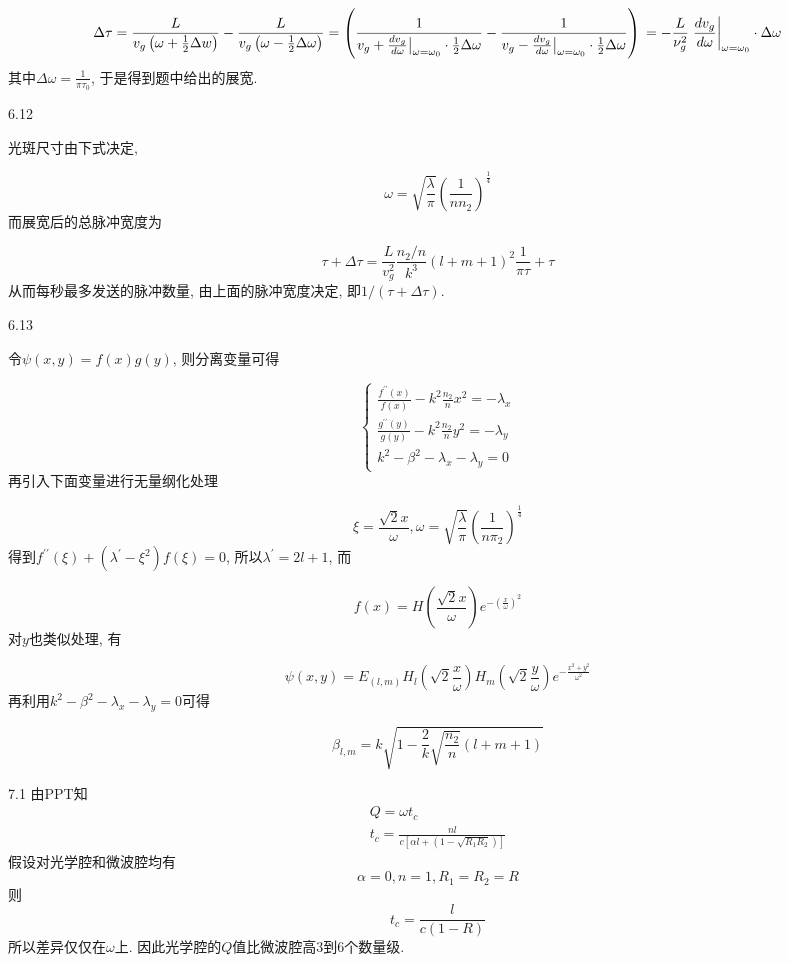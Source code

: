 \[\Delta\tau=\frac{L}{v_{g}\left(\omega+\frac{1}{2} \Delta w\right)}-\frac{L}{v_{g}\left(\omega-\frac{1}{2} \Delta \omega\right)}=\left(\frac{1}{v_g+\frac{d v_{g}}{d \omega} \big| _{\omega=\omega_{0}} \cdot \frac{1}{2} \Delta \omega}-\frac{1}{v_g-\frac{d v_{g}}{d \omega} \big| _{\omega=\omega_{0}} \cdot \frac{1}{2} \Delta \omega}\right)\\=-\frac{L}{\nu_{g}^{2}}\left.\frac{d v_{g}}{d \omega}\right|_{\omega=\omega_{0}} \cdot \Delta \omega \]
其中\(\Delta \omega=\frac{1}{\pi \tau_{0}}\), 于是得到题中给出的展宽.

6.12

光斑尺寸由下式决定,

\[\omega=\sqrt{\frac{\lambda}{\pi}}\left(\frac{1}{n n_{2}}\right)^{\frac{1}{4}} \]
而展宽后的总脉冲宽度为

\[\tau+\Delta \tau=\frac{L}{v_{g}^{2}} \frac{n_{2} / n}{k^{3}}(l+m+1)^{2} \frac{1}{\pi \tau}+\tau \]
从而每秒最多发送的脉冲数量, 由上面的脉冲宽度决定, 即\(1/(\tau+\Delta\tau)\).

6.13

令\(\psi(x, y)=f(x) g(y)\), 则分离变量可得

\[\left\{\begin{array}{l}{\frac{f^{\prime \prime}(x)}{f(x)}-k^{2} \frac{n_{2}}{n} x^{2}=-\lambda_x} \\ {\frac{g^{\prime \prime}(y)}{g(y)}-k^{2} \frac{n_{2}}{n} y^{2}=-\lambda_{y}} \\ {k^{2}-\beta^{2}-\lambda_{x}-\lambda_{y}=0}\end{array}\right. \]
再引入下面变量进行无量纲化处理

\[\xi=\frac{\sqrt{2} x}{\omega}, \omega=\sqrt{\frac{\lambda}{\pi}}\left(\frac{1}{n \pi_{2}}\right)^{\frac{1}{4}} \]
得到\(f^{\prime \prime}(\xi)+\left(\lambda^{\prime}-\xi^{2}\right) f(\xi)=0\), 所以\(\lambda^{\prime}=2 l+1\), 而

\[f(x)=H\left(\frac{\sqrt{2} x}{\omega}\right) e^{-\left(\frac{x}{\omega}\right)^{2}} \]
对\(y\)也类似处理, 有

\[\psi(x, y)=E_{(l, m)} H_{l}\left(\sqrt{2} \frac{x}{\omega}\right) H_{m}\left(\sqrt{2} \frac{y}{\omega}\right) e^{-\frac{x^{2}+y^{2}}{\omega^{2}}} \]
再利用\(k^{2}-\beta^{2}-\lambda_{x}-\lambda_{y}=0\)可得

\[\beta_{l, m}=k \sqrt{1-\frac{2}{k} \sqrt{\frac{n_{2}}{n}}(l+m+1)} \]



7.1
由PPT知
\begin{gather}
    Q=\omega t_{c}\\
    t_{c}=\frac{n l}{c\left[\alpha l+\left(1-\sqrt{R_{1} R_{2}}\right)\right]}
\end{gather}
假设对光学腔和微波腔均有
$$
\alpha=0, n=1, R_1=R_2=R
$$
则
$$
t_c=\frac{l}{c(1-R)}
$$
所以差异仅仅在$\omega$上. 因此光学腔的\(Q\)值比微波腔高\(3\)到\(6\)个数量级.

